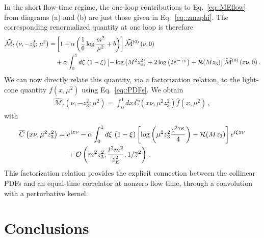 In the short flow-time regime, the one-loop contributions to Eq.~\eqref{eq::MEflow} from diagrams (a) and (b) are just those given in Eq.~\eqref{eq::zmzphi}. The corresponding
renormalized quantity at one loop is therefore
\begin{align}
\label{eq::tIoffe1loopren}
    \widehat{\mathcal{M}}_t\left(\nu, -z_3^2;\,\mu^2\right) =&
    \left[1+ \alpha\left(\frac{1}{6}\log\frac{m^2}{\mu^2} + b\right)  \right]\widehat{\mathcal{M}}^{(0)}\left(\nu, 0\right) \nonumber \\
    &+\alpha \int_0^1 d\xi\,\left(1-\xi\right)
    \left[-\log\left( M^2 z_3^2\right)+ 2 \log\left(2e^{-\gamma_E}\right) + {\cal R}(Mz_3)\right] \widehat{\mathcal{M}}^{(0)}\left(x \nu, 0\right) .
\end{align}
We can now directly relate this quantity, via a factorization relation, to the light-cone quantity $f(x,\mu^2)$ using Eq.~\eqref{eq::PDFs}. We obtain
\begin{align}
	\label{eq::factt}
	\widehat{\mathcal{M}}_t\left(\nu, -z_3^2; \mu^2\right) = 
	\int_{0}^{1} dx\,\overline{C}\left(x\nu, \mu^2 z_3^2 \right) \widehat{f}\left(x,\mu^2\right)\, ,
\end{align}
with
\begin{align}
	\label{eq::Cpseudot}
	\overline{C}\left(x\nu,\mu^2 z_3^2 \right) = {} & 
	 e^{i x\nu} - \alpha\int_0^1 d\xi \, 
	 \left(1-\xi\right) \left[
	 \log\left( \mu^2 z_3^2\frac{e^{2\gamma_E}}{4} \right) - {\cal R}(Mz_3)\right] e^{i \xi x\nu} \nonumber \\
         & {} + \mathcal{O}\left(m^2 z_3^2,\frac{t^2 m^2}{z_E^2},
                1/\overline{z}^2\right)\, .
\end{align}
This factorization relation provides the explicit connection between the collinear PDFs and an
equal-time correlator at nonzero flow time, through a convolution with a perturbative kernel.

  
\section{Conclusions}
\label{sec:conclusion}

